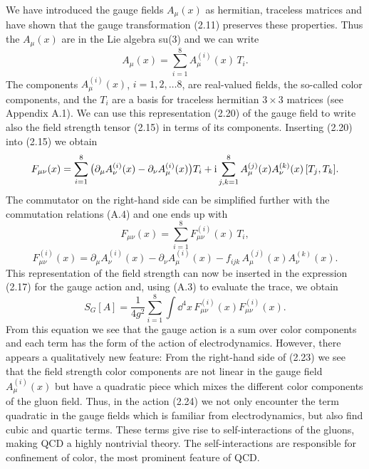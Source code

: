We have introduced the gauge fields $A_\mu(x)$ as hermitian, traceless
matrices and have shown that the gauge transformation (2.11) preserves these
properties. Thus the $A_\mu(x)$ are in the Lie algebra su(3) and we can
write
\begin{equation}
  A_\mu(x) = \sum_{i=1}^{8} A_\mu^{(i)}(x)\, T_i .
\end{equation}
The components $A_\mu^{(i)}(x)$, $i = 1, 2, \ldots 8$, are real-valued
fields, the so-called color components, and the $T_i$ are a basis for
traceless hermitian $3 \times 3$ matrices (see Appendix A.1). We can use
this representation (2.20) of the gauge field to write also the field
strength tensor (2.15) in terms of its components. Inserting (2.20) into
(2.15) we obtain
\begin{equation}
  F_{\mu\nu}(x) = \sum_{i=1}^{8}
    \big(\partial_\mu A_\nu^{(i)}(x) - \partial_\nu A_\mu^{(i)}(x)\big) T_i
    + \mathrm{i} \sum_{j,k=1}^{8} A_\mu^{(j)}(x) A_\nu^{(k)}(x)\,
      [T_j, T_k] .
\end{equation}
The commutator on the right-hand side can be simplified further with the
commutation relations (A.4) and one ends up with
\begin{equation}
  F_{\mu\nu}(x) = \sum_{i=1}^{8} F_{\mu\nu}^{(i)}(x)\, T_i ,
\end{equation}
\begin{equation}
  F_{\mu\nu}^{(i)}(x) = \partial_\mu A_\nu^{(i)}(x) - \partial_\nu A_\mu^{(i)}(x)
    - f_{ijk}\, A_\mu^{(j)}(x) A_\nu^{(k)}(x) .
\end{equation}
This representation of the field strength can now be inserted in the
expression (2.17) for the gauge action and, using (A.3) to evaluate the
trace, we obtain
\begin{equation}
  S_G[A] = \frac{1}{4 g^2} \sum_{i=1}^{8}
    \int \dd^4 x\, F_{\mu\nu}^{(i)}(x) F_{\mu\nu}^{(i)}(x) .
\end{equation}
From this equation we see that the gauge action is a sum over color
components and each term has the form of the action of electrodynamics.
However, there appears a qualitatively new feature: From the right-hand side
of (2.23) we see that the field strength color components are not linear in
the gauge field $A_\mu^{(i)}(x)$ but have a quadratic piece which mixes the
different color components of the gluon field. Thus, in the action (2.24) we
not only encounter the term quadratic in the gauge fields which is familiar
from electrodynamics, but also find cubic and quartic terms. These terms
give rise to self-interactions of the gluons, making QCD a highly
nontrivial theory. The self-interactions are responsible for confinement of
color, the most prominent feature of QCD.

